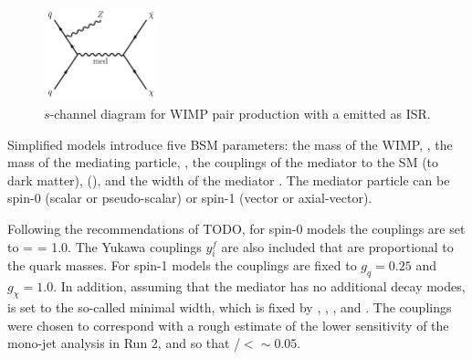 \begin{figure}[htb]
\centering
\includegraphics[width=0.3\textwidth]{Figures/simp.png}
\caption{$s$-channel diagram for WIMP pair production with a \Z emitted as ISR.}
\label{fig:simp}
\end{figure}

Simplified models introduce five BSM parameters: the mass of the WIMP, \mchi, the mass of the mediating particle, \mmed, the couplings of the mediator to the SM (to dark matter), \gq (\gchi), and the width of the mediator \Wmed. The mediator particle can be spin-0 (scalar or pseudo-scalar) or spin-1 (vector or axial-vector). 




Following the recommendations of TODO, for spin-0 models the couplings are set to \gq = \gchi = 1.0. The Yukawa couplings $y_i^f$ are also included that are proportional to the quark masses. For spin-1 models the couplings are fixed to $g_q = 0.25$ and $g_\chi = 1.0$. In addition, assuming that the mediator has no additional decay modes, \Wmed is set to the so-called minimal width, which is fixed by \gq, \gchi, \mchi, and \mmed. %
The couplings were chosen to correspond with a rough estimate of the lower sensitivity of the mono-jet analysis in Run 2, and so that \Wmed/\mmed$ < \sim 0.05$.


